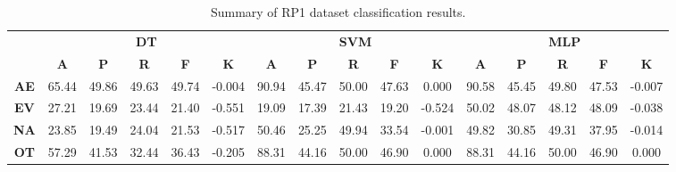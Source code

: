 \begin{landscape}
\begin{table}[htbp]
\footnotesize
\centering
\caption{Summary of RP1 dataset classification results.}
\label{tab:base_female}
\begin{tabular}{|c|c|c|c|c|c|c|c|c|c|c|c|c|c|c|c|}
\hline
\multirow{2}{*}{}	& \multicolumn{5}{c|}{\textbf{DT}}												& \multicolumn{5}{c|}{\textbf{SVM}}												& \multicolumn{5}{c|}{\textbf{MLP}}												\\ \cline{2-16} 
					& \textbf{A}	& \textbf{P}	& \textbf{R}	& \textbf{F}	& \textbf{K}	& \textbf{A}	& \textbf{P}	& \textbf{R}	& \textbf{F}	& \textbf{K}	& \textbf{A}	& \textbf{P}	& \textbf{R}	& \textbf{F}	& \textbf{K}	\\ \hline
\textbf{AE}			& 65.44			& 49.86			& 49.63			& 49.74			& -0.004			& 90.94			& 45.47			& 50.00			& 47.63			& 0.000			& 90.58			& 45.45			& 49.80			& 47.53			& -0.007			\\ \hline
\textbf{EV}			& 27.21			& 19.69			& 23.44			& 21.40			& -0.551			& 19.09			& 17.39			& 21.43			& 19.20			& -0.524			& 50.02			& 48.07			& 48.12			& 48.09			& -0.038			\\ \hline
\textbf{NA}			& 23.85			& 19.49			& 24.04			& 21.53			& -0.517			& 50.46			& 25.25			& 49.94			& 33.54			& -0.001			& 49.82			& 30.85			& 49.31			& 37.95			& -0.014			\\ \hline
\textbf{OT}			& 57.29			& 41.53			& 32.44			& 36.43			& -0.205			& 88.31			& 44.16			& 50.00			& 46.90			& 0.000			& 88.31			& 44.16			& 50.00			& 46.90			& 0.000			\\ \hline
\end{tabular}
\end{table}
\end{landscape}